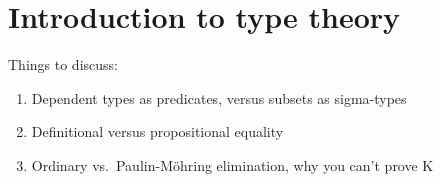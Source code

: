 \chapter{Introduction to type theory}
\label{cha:introduction}

Things to discuss:
\begin{enumerate}
\item Dependent types as predicates, versus subsets as sigma-types
\item Definitional versus propositional equality
\item Ordinary vs.\ Paulin-M\"ohring elimination, why you can't prove K
\end{enumerate}

